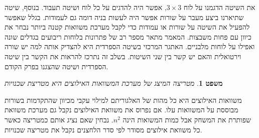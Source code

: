 \documentclass[12pt,leqno]{article}
\theoremstyle{theoremdd}
\newtheorem{theorem}{משפט}[section]
\begin{document}
את השיטה הדגמנו על לוח 
$3 \times 3$,
אפשר היה להדגים על כל לוח ושיטה תעבוד.
בנוסף, שיטה שתיארנו ביצע מעבר על שורות אפשר היה לעשות בניה דומה גם לעמודות.
בגלל שאפשר להפעיל את השיטה על שורות או עמודות 
כדי לקבל מערכת משוואות קטנה ביותר נבחר 
את כיוון עם פחות משבצות.
המאמר 
\cite{B1}
מתאר מספר רב של פתרונות  בלוחות ריבועים בגדלים שונה ואפילו על לוחות מלבניים.
האתגר המרכזי בשיטה הספרדית היא להצדיק אותה למה יש שורה וירטואלית
והאם יש קשר בין שני השיטות.
בשלב זה נתרכז להראות את הקשר בין שיטה הספרדית ושיטה שהצגנו בפרק הקודם.
\begin{theorem}
    מטריצה המיצג של מערכת המשוואות האילוצים היא מטריצת שכנויות
\end{theorem}
משוואות האילוצים היא כל מהות של האלגוריתם למילוי עקבי
מכיוון שהתקדמות בשורות מבוססת על המשוואות עלו.
אם נפרוס את משוואת האילוצים נקבל גם מערכת משוואת שפותרת את המשחק
אבל כמות המשואות הינה 
$n^2$.
נבחין שאם נציג אותם כמטריצה כאשר כל משוואת אילוצים מסודר לפי סדר הלחצנים נקבל את מטריצה שכנויות.
\end{document}
